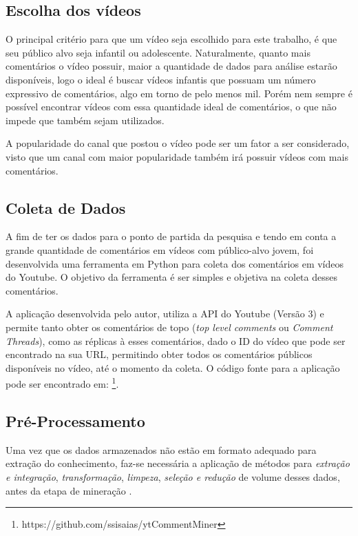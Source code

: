\subsection{Escolha dos vídeos}
O principal critério para que um vídeo seja escolhido para este trabalho, é que seu público alvo seja infantil ou adolescente. Naturalmente, quanto mais comentários o vídeo possuir, maior a quantidade de dados para análise estarão disponíveis, logo o ideal é buscar vídeos infantis que possuam um número expressivo de comentários, algo em torno de pelo menos mil. Porém nem sempre é possível encontrar vídeos com essa quantidade ideal de comentários, o que não impede que também sejam utilizados. 

A popularidade do canal que postou o vídeo pode ser um fator a ser considerado, visto que um canal com maior popularidade também irá possuir vídeos com mais comentários.

\subsection{Coleta de Dados}
A fim de ter os dados para o ponto de partida da pesquisa e tendo em conta a grande quantidade de comentários em vídeos com público-alvo jovem, foi desenvolvida uma ferramenta em Python para coleta dos comentários em vídeos do Youtube. O objetivo da ferramenta é ser simples e objetiva na coleta desses comentários.

A aplicação desenvolvida pelo autor, utiliza a API do Youtube (Versão 3) e permite tanto obter os comentários de topo (\textit{top level comments} ou \textit{Comment Threads}), como as réplicas à esses comentários, dado o ID do vídeo que pode ser encontrado na sua URL, permitindo obter todos os comentários públicos disponíveis no vídeo, até o momento da coleta. O código fonte para a aplicação pode ser encontrado em: \footnote{https://github.com/ssisaias/ytCommentMiner}.


\subsection{Pré-Processamento}
Uma vez que os dados armazenados não estão em formato adequado para extração do conhecimento, faz-se necessária a aplicação de métodos para \textit{extração e integração}, \textit{transformação},
\textit{limpeza}, \textit{seleção e redução} de volume desses dados, antes da etapa de mineração \cite{morais2007mineraccao}.

